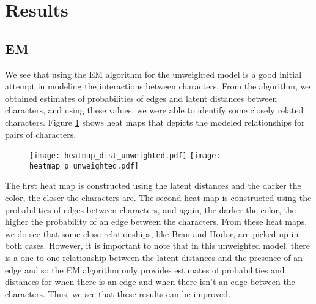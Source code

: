 \documentclass{article}
\begin{document}
\section{Results} \label{Results}

\subsection{EM}
We see that using the EM algorithm for the unweighted model is a good initial attempt in modeling the interactions between characters. From the algorithm, we obtained estimates of probabilities of edges and latent distances between characters, and using these values, we were able to identify some closely related characters. Figure \ref{heatmap_unweighted} shows heat maps that depicts the modeled relationships for pairs of characters. 

\begin{figure}[h!]
\centering
\texttt{[image: heatmap\_dist\_unweighted.pdf]}
\texttt{[image: heatmap\_p\_unweighted.pdf]}
\caption{}
\label{heatmap_unweighted}
\end{figure}

The first heat map is constructed using the latent distances and the darker the color, the closer the characters are. The second heat map is constructed using the probabilities of edges between characters, and again, the darker the color, the higher the probability of an edge between the characters. From these heat maps, we do see that some close relationships, like Bran and Hodor, are picked up in both cases. However, it is important to note that in this unweighted model, there is a one-to-one relationship between the latent distances and the presence of an edge and so the EM algorithm only provides estimates of probabilities and distances for when there is an edge and when there isn't an edge between the characters. Thus, we see that these results can be improved.
\end{document}
